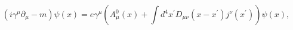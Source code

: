\begin{equation}
\left( i\gamma ^{\mu }\partial _{\mu }-m\right) \psi (x)=e\gamma ^{\mu
}\left( A_{\mu }^{0}(x)+\int d^{4}x^{\prime }D_{\mu \nu }(x-x^{\prime
})j^{\nu }(x^{\prime })\right) \psi (x),
\end{equation}


